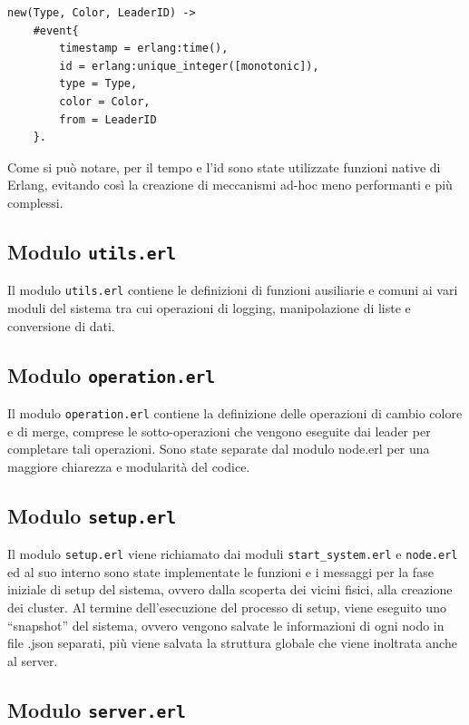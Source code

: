 \documentclass[12pt, a4paper]{report}
\begin{document}
\begin{tcolorbox}[title=Creazione di un nuovo evento]
\begin{verbatim}
new(Type, Color, LeaderID) ->
    #event{
        timestamp = erlang:time(),
        id = erlang:unique_integer([monotonic]),
        type = Type,
        color = Color,
        from = LeaderID
    }.
\end{verbatim}
\end{tcolorbox}

Come si pu\`o notare, per il tempo e l'id sono state utilizzate funzioni native di Erlang, evitando cos\`i la creazione di meccanismi ad-hoc meno performanti e pi\`u complessi.

\subsection{Modulo \texttt{utils.erl}}

Il modulo \texttt{utils.erl} contiene le definizioni di funzioni ausiliarie e comuni ai vari moduli del sistema tra cui operazioni di logging, manipolazione di liste e conversione di dati.

\subsection{Modulo \texttt{operation.erl}}

Il modulo \texttt{operation.erl} contiene la definizione delle operazioni di cambio colore e di merge, comprese le sotto-operazioni che vengono eseguite dai leader per completare tali operazioni. Sono state separate dal modulo node.erl per una maggiore chiarezza e modularità del codice.

\subsection{Modulo \texttt{setup.erl}}

Il modulo \texttt{setup.erl} viene richiamato dai moduli \texttt{start\_system.erl} e \texttt{node.erl} ed al suo interno sono state implementate le funzioni e i messaggi per la fase iniziale di setup del sistema, ovvero dalla scoperta dei vicini fisici, alla creazione dei cluster. Al termine dell'esecuzione del processo di setup, viene eseguito uno ``snapshot'' del sistema, ovvero vengono salvate le informazioni di ogni nodo in file .json separati, pi\`u viene salvata la struttura globale che viene inoltrata anche al server.

\subsection{Modulo \texttt{server.erl}}
\end{document}
